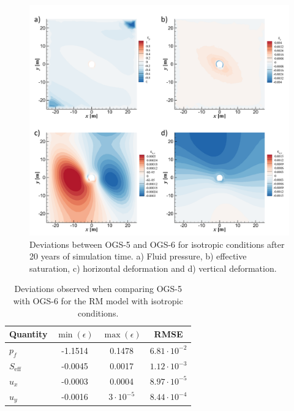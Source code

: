 \begin{figure}[t]
\includegraphics[width=\textwidth, trim=0.5cm  0.0cm 0 0.0cm, clip]{./figures/MEX10_RM_error_2d_isotropic.png}
\caption{Deviations between OGS-5 and OGS-6 for isotropic conditions after 20 years of simulation time.  a) Fluid pressure, b) effective saturation, c) horizontal deformation and d) vertical deformation.}
\label{fig:RM_error_2d_isotropic}
\end{figure}

\begin{table}
 \caption{Deviations observed when comparing OGS-5 with OGS-6 for the RM model with isotropic conditions.\label{tab:error_RM_isotropic}}
\begin{center}
\begin{tabular}{ l | c | c | c }
 Quantity				& $\min{(\epsilon)}$ 	& $\max{(\epsilon)}$	 & RMSE  \\
 \hline
 $p_f$				& -1.1514 				& 0.1478 			& $6.81\cdot 10^{-2}$\\ 
 $S_\text{eff}$	 	& -0.0045 				& 0.0017			& $1.12\cdot 10^{-3}$\\		
 $u_x$				& -0.0003 				& 0.0004			& $8.97\cdot 10^{-5}$\\		 
 $u_y$			 	& -0.0016 				& $3\cdot10^{-5}$	& $8.44\cdot 10^{-4}$\\	
\end{tabular}
\end{center}
\end{table}

